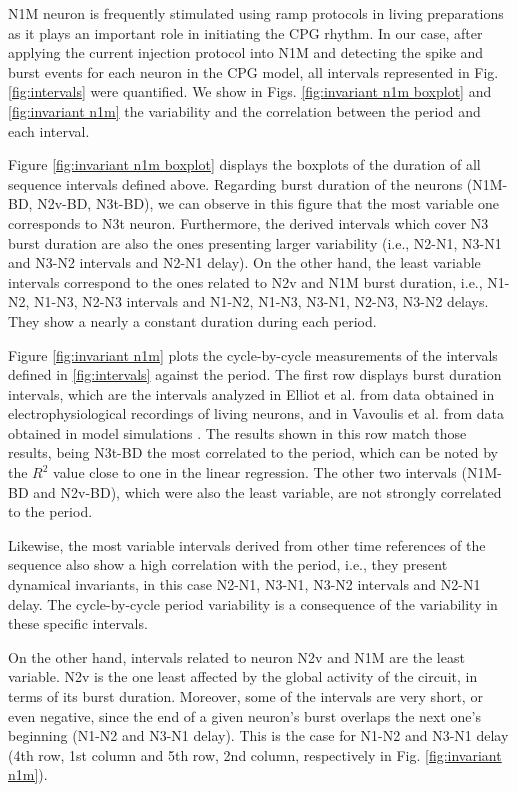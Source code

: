 N1M neuron is frequently stimulated using ramp protocols in living preparations \parencite{elliott_temporal_1991} as it plays an important role in initiating the CPG rhythm. In our case, after applying the current injection protocol into N1M and detecting the spike and burst events for each neuron in the CPG model, all  intervals represented in Fig. \ref{fig:intervals} were quantified. We show in Figs. \ref{fig:invariant n1m boxplot} and \ref{fig:invariant n1m} the variability and the correlation between the period and each interval.

Figure \ref{fig:invariant n1m boxplot} displays the boxplots of the duration of all sequence intervals defined above. Regarding burst duration of the neurons (N1M-BD, N2v-BD, N3t-BD), we can observe in this figure that the most variable one corresponds to N3t neuron. Furthermore, the derived intervals which cover N3 burst duration are also the ones presenting larger variability (i.e., N2-N1, N3-N1 and N3-N2 intervals and N2-N1 delay). On the other hand, the least variable intervals correspond to the ones related to N2v and N1M burst duration, i.e., N1-N2, N1-N3, N2-N3 intervals and N1-N2, N1-N3, N3-N1, N2-N3, N3-N2 delays. They show a nearly a constant duration during each period.

Figure \ref{fig:invariant n1m} plots the cycle-by-cycle measurements of the intervals defined in \ref{fig:intervals} against the period. The first row displays burst duration intervals, which are the intervals analyzed in Elliot et al. \parencite{elliott_temporal_1991} from data obtained in electrophysiological recordings of living neurons, and in Vavoulis et al. from data obtained in model simulations \parencite{vavoulis_computational_2007}. The results shown in this row match those results, being N3t-BD the most correlated to the period, which can be noted by the $R^2$ value close to one in the linear regression. The other two intervals (N1M-BD and N2v-BD), which were also the least variable, are not strongly correlated to the period. 

Likewise, the most variable intervals derived from other time references of the sequence also show a high correlation with the period, i.e., they present dynamical invariants, in this case N2-N1, N3-N1, N3-N2 intervals and N2-N1 delay. The cycle-by-cycle period variability is a consequence of the variability in these specific intervals.

On the other hand, intervals related to neuron N2v and N1M are the least variable. N2v is the one least affected by the global activity of the circuit, in terms of its burst duration. Moreover, some of the intervals are very short, or even negative, since the end of a given neuron's burst overlaps the next one's beginning (N1-N2 and N3-N1 delay). This is the case for N1-N2 and N3-N1 delay (4th row, 1st column and 5th row, 2nd column, respectively in Fig. \ref{fig:invariant n1m}).  


